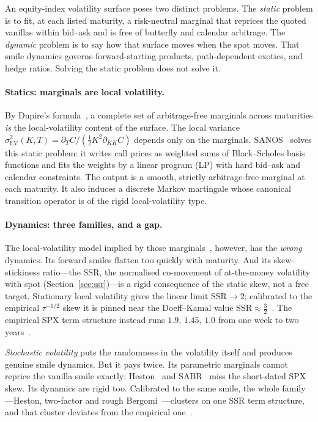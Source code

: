 \documentclass[11pt]{article}
\newcommand{\SSR}{\mathrm{SSR}}
\begin{document}
An equity-index volatility surface poses two distinct problems. The \emph{static}
problem is to fit, at each listed maturity, a risk-neutral marginal that reprices the
quoted vanillas within bid--ask and is free of butterfly and calendar arbitrage. The
\emph{dynamic} problem is to say how that surface moves when the spot moves. That smile
dynamics governs forward-starting products, path-dependent exotics, and hedge ratios. Solving the
static problem does not solve it.

\paragraph{Statics: marginals are local volatility.}
By Dupire's formula~\cite{dupire1994}, a complete set of arbitrage-free marginals across
maturities \emph{is} the local-volatility content of the surface. The local variance
$\sigma_{\mathrm{LV}}^2(K,T)=\partial_T C/(\tfrac12 K^2\partial_{KK}C)$ depends only on the
marginals. SANOS~\cite{buehler2026sanos} solves this static problem: it writes call
prices as weighted sums of Black--Scholes basis functions and fits the weights by a linear
program (LP) with hard bid--ask and calendar constraints. The output is a smooth, strictly
arbitrage-free marginal at each maturity. It also induces a discrete Markov martingale whose
canonical transition operator is of the rigid local-volatility type.

\paragraph{Dynamics: three families, and a gap.}
The local-volatility model implied by those marginals~\cite{dermankani1994,rubinstein1994}, however,
has the \emph{wrong} dynamics. Its forward smiles flatten too quickly with maturity. And its
skew-stickiness ratio---the SSR, the normalised co-movement of at-the-money volatility with spot
(Section~\ref{sec:ssr})---is a rigid consequence of the static skew, not a free target.
Stationary local volatility gives the linear limit $\SSR\!\to\!2$; calibrated to the empirical
$\tau^{-1/2}$ skew it is pinned near the Doeff--Kamal value $\SSR\approx\tfrac32$~\cite{doeffkamal2012}.
The empirical SPX term structure instead runs $1.9,\,1.45,\,1.0$ from one week to two
years~\cite{bergomi2009,bergomi2016}.

\emph{Stochastic volatility} puts the randomness in the volatility itself and produces genuine smile
dynamics. But it pays twice. Its parametric marginals cannot reprice the vanilla smile exactly:
Heston~\cite{heston1993} and SABR~\cite{hagan2002} miss the short-dated SPX skew. Its dynamics are
rigid too. Calibrated to the same smile, the whole family---Heston, two-factor and rough
Bergomi~\cite{bergomi2016}---clusters on one SSR term structure, and that cluster deviates from the
empirical one~\cite{bourgey2024,frizgatheral2024}.
\end{document}
